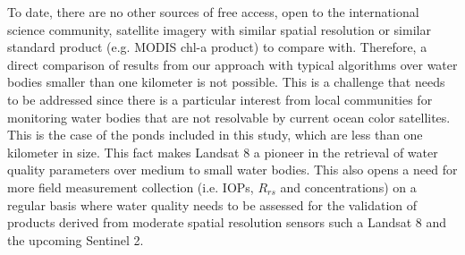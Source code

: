 To date, there are no other sources of free access, open to the international science community, satellite imagery with similar spatial resolution or similar standard product (e.g. MODIS chl-a product) to compare with. Therefore, a direct comparison of results from our approach with typical algorithms over water bodies smaller than one kilometer is not possible. This is a challenge that needs to be addressed since there is a particular interest from local communities for monitoring water bodies that are not resolvable by current ocean color satellites. This is the case of the ponds included in this study, which are less than one kilometer in size. This fact makes Landsat 8 a pioneer in the retrieval of water quality parameters over medium to small water bodies. This also opens a need for more field measurement collection (i.e. IOPs, $R_{rs}$ and concentrations) on a regular basis where water quality needs to be assessed for the validation of products derived from moderate spatial resolution sensors such a Landsat 8 and the upcoming Sentinel 2. 